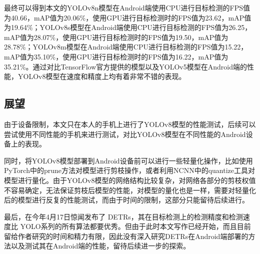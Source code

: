 \documentclass{ctexart}
\numberwithin{equation}{section}%
\numberwithin{figure}{section}%
\numberwithin{table}{section}%
\begin{document}
	最终可以得到本文的YOLOv8n模型在Android端使用CPU进行目标检测的FPS值为40.66，mAP值为20.06\%，使用GPU进行目标检测时的FPS值为23.62，mAP值为19.64\%；YOLOv8s模型在Android端使用CPU进行目标检测的FPS值为26.25，mAP值为28.07\%，使用GPU进行目标检测时的FPS值为19.50，mAP值为28.78\%；YOLOv8m模型在Android端使用CPU进行目标检测的FPS值为15.22，mAP值为35.10\%，使用GPU进行目标检测时的FPS值为16.22，mAP值为35.21\%。通过对比TensorFlow官方提供的模型以及YOLOv5模型在Android端的性能，YOLOv8模型在速度和精度上均有着非常不错的表现。
	
	\subsection{展望}
	由于设备限制，本文只在本人的手机上进行了YOLOv8模型的性能测试，后续可以尝试使用不同性能的手机来进行测试，对比YOLOv8模型在不同性能的Android设备上的表现。
	
	同时，将YOLOv8模型部署到Android设备前可以进行一些轻量化操作，比如使用PyTorch中的prune方法对模型进行剪枝操作，或者利用NCNN中的quantize工具对模型进行量化。由于YOLOv8模型的网络结构比较复杂，对网络各部分的剪枝权值不容易确定，无法保证剪枝后模型的性能，对模型的量化也是一样，需要对轻量化后的模型进行反复的性能测试，而由于时间的限制，这部分只能留待后续进行。
	
	最后，在今年4月17日惊闻发布了 DETRs\textsuperscript{\cite{22}}，其在目标检测上的检测精度和检测速度比 YOLO系列的所有算法都要优秀。但由于此时本文写作已经开始，而且目前留给作者研究的时间和精力有限，因此没有深入研究DETRs在Android端部署的方法以及测试其在Android端的性能，留待后续进一步的探索。
\end{document}
